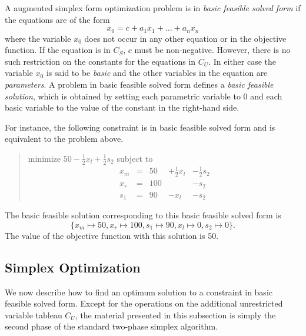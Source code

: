 \documentclass{uist96}
\begin{document}
%

A augmented simplex form optimization problem is in 
\emph{basic feasible solved form} if the equations are of the form 
$$x_0 = c + a_1 x_1 + \ldots + a_n x_n$$ where the variable $x_0$ does not
occur in any other equation or in the objective function.  If the equation
is in $C_S$, $c$ must be non-negative.  However, there is no
such restriction on the constants for the equations in $C_U$\@.  In either
case the variable $x_0$ is said to be \emph{basic} and the other
variables in the equation are \emph{parameters}.  A problem in basic
feasible solved form defines a \emph{basic feasible solution}, which is
obtained by setting each parametric variable to 0 and each basic variable
to the value of the constant in the right-hand side.

For instance, the following constraint
is in basic feasible solved form and is equivalent to the 
problem above.
\begin{quote}\vspace*{-1ex}
minimize $50 - \frac{1}{2} x_l + \frac{1}{2} s_2 $ 
subject to 
$$
\begin{array}{rlrrr} 
x_m & = &50 & + \frac{1}{2} x_l & - \frac{1}{2} s_2 \\
x_r & = &100 &  & - s_2 \\ \hline
s_1 & = &90 & - x_l &  - s_2 
\end{array}
$$
\end{quote}\vspace{-0.9ex}
The basic feasible solution corresponding to this
basic feasible solved form is 
$$\{x_m \mapsto 50, x_r \mapsto 100, s_1 \mapsto 90, x_l \mapsto 0, 
s_2 \mapsto 0\}.$$
The value of the objective function with this solution is 50.

\subsection{Simplex Optimization}
\label{simplex-optimization}

We now describe how to find an optimum solution to a constraint in basic
feasible solved form.  Except for the operations on the additional
unrestricted variable tableau $C_U$, the material presented in this
subsection is simply the second phase of the standard two-phase simplex algorithm.
\end{document}
